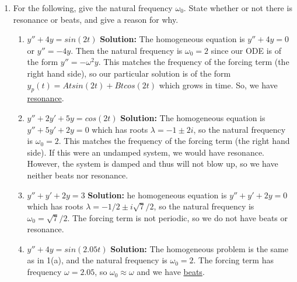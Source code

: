 \documentclass[letterpaper, fontsize=11pt]{scrartcl} %
\numberwithin{equation}{section} %
\numberwithin{figure}{section} %
\numberwithin{table}{section} %
\begin{document}
\begin{enumerate}
\item For the following, give the natural frequency \textit{$\omega_0$}. State whether or not there is resonance or beats, and give a reason for why.
\begin{enumerate}
\item $y'' + 4y = sin(2t)$ \newline
\textbf{Solution:} 
The homogeneous equation is $y'' + 4y = 0 $ or $ y'' = -4y$.
Then the natural frequency is $\omega_0 = 2$ since our ODE is of the form $y'' = -\omega^2y$. This matches the frequency of the forcing term (the right hand side), so our particular solution is of the form $y_p(t) = Atsin(2t) + Btcos(2t)$ which grows in time. So, we have \underline{resonance}. 
\item $y'' + 2y' + 5y = cos(2t)$ \newline
\textbf{Solution:} 
The homogeneous equation is $y'' + 5y' + 2y = 0 $ which has roots $\lambda = -1 \pm 2i$, so the natural frequency is $\omega_0 = 2$. This matches the frequency of the forcing term (the right hand side). If this were an undamped system, we would have resonance. However, the system is damped and thus will not blow up, so we have neither beats nor resonance.
\item $y'' + y' + 2y = 3$ \newline
\textbf{Solution:} 
he homogeneous equation is $y'' + y' + 2y = 0 $ which has roots $\lambda = -1/2 \pm i\sqrt{7}/2$, so the natural frequency is $\omega_0 = \sqrt{7}/2$. The forcing term is not periodic, so we do not have beats or resonance.  
\item $y'' + 4y = sin(2.05t)$ \newline
\textbf{Solution:} 
The homogeneous problem is the same as in 1(a), and the natural frequency is $\omega_0 = 2$. The forcing term has frequency $\omega = 2.05$, so $\omega_0 \approx \omega$ and we have \underline{beats}. 
\end{enumerate}


\end{enumerate}
\end{document}
